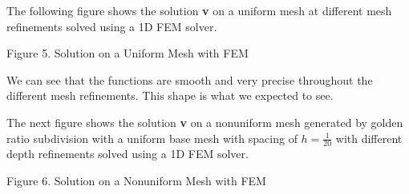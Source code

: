 \documentclass[11pt, oneside]{article}   	%
\begin{document}
\begin{enumerate}
The following figure shows the solution \textbf{v} on a uniform mesh at different mesh refinements solved using a 1D FEM solver.

\vspace{2mm}

\centerline {}
\centerline{Figure 5. Solution on a Uniform Mesh with FEM}

\vspace{2mm}

We can see that the functions are smooth and very precise throughout the different mesh refinements. This shape is what we expected to see. 

The next figure shows the solution \textbf{v} on a nonuniform mesh generated by golden ratio subdivision with a uniform base mesh with spacing of $h = \frac{1}{20}$ with different depth refinements solved using a 1D FEM solver.

\vspace{2mm}

\centerline {}
\centerline{Figure 6. Solution on a Nonuniform Mesh with FEM}


\end{enumerate}
\end{document}
